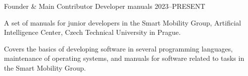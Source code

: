 

\begin{cventries}

  \cventry
    {Founder \& Main Contributor} %
    {} %
    {Developer manuals} %
    {2023--PRESENT} %
    {
      \begin{cvitems} %
        \item {A set of manuals for junior developers in the Smart Mobility Group, Artificial Intelligence Center, Czech Technical University in Prague.}
        \item Covers the basics of developing software in several programming languages, maintenance of operating systems, and manuals for software related to tasks in the Smart Mobility Group.
      \end{cvitems}
    }

\end{cventries}
